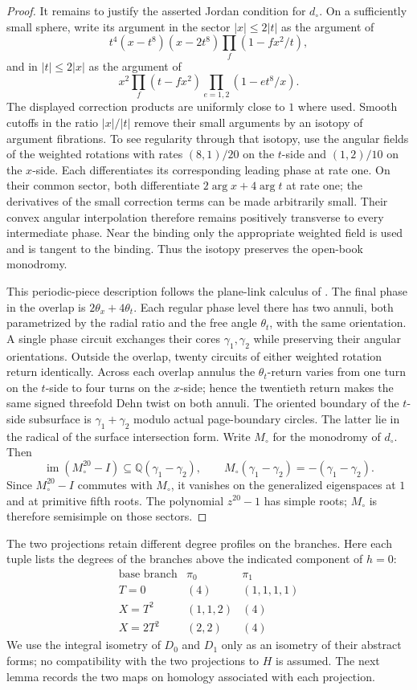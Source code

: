 \begin{proof}
It remains to justify the asserted Jordan condition for \(d_\circ\).
On a sufficiently small sphere, write its argument in the sector
\(|x|\le2|t|\) as the argument of
\[
 t^4(x-t^8)(x-2t^8)
 \prod_f(1-fx^2/t),
\]
and in \(|t|\le2|x|\) as the argument of
\[
 x^2\prod_f(t-fx^2)
 \prod_{e=1,2}(1-et^8/x).
\]
The displayed correction products are uniformly close to \(1\)
where used. Smooth cutoffs in the ratio \(|x|/|t|\) remove their
small arguments by an isotopy of argument fibrations. To see
regularity through that isotopy, use the angular fields of the
weighted rotations with rates \((8,1)/20\) on the \(t\)-side and
\((1,2)/10\) on the \(x\)-side. Each differentiates its corresponding
leading phase at rate one. On their common sector, both differentiate
\(2\arg x+4\arg t\) at rate one; the derivatives of the small
correction terms can be made arbitrarily small. Their convex angular
interpolation therefore remains positively transverse to every
intermediate phase. Near the binding only the appropriate weighted
field is used and is tangent to the binding. Thus the isotopy
preserves the open-book monodromy.

This periodic-piece description follows the plane-link calculus of \cite[Sections~11 and~13]{EisenbudNeumann1985}. The final phase in the overlap is \(2\theta_x+4\theta_t\).
Each regular phase level there has two annuli, both parametrized
by the radial ratio and the free angle \(\theta_t\), with the same
orientation. A single phase circuit exchanges their cores
\(\gamma_1,\gamma_2\) while preserving their angular orientations.
Outside the overlap, twenty circuits of either weighted rotation
return identically. Across each overlap annulus the
\(\theta_t\)-return varies from one turn on the \(t\)-side to four
turns on the \(x\)-side; hence the twentieth return makes the same
signed threefold Dehn twist on both annuli. The oriented boundary
of the \(t\)-side subsurface is \(\gamma_1+\gamma_2\) modulo actual
page-boundary circles. The latter lie in the radical of the surface
intersection form. Write \(M_\circ\) for the monodromy of
\(d_\circ\). Then
\[
 \operatorname{im}(M_\circ^{20}-I)\subseteq
 \mathbb Q(\gamma_1-\gamma_2),\qquad
 M_\circ(\gamma_1-\gamma_2)=-(\gamma_1-\gamma_2).
\]
Since \(M_\circ^{20}-I\) commutes with \(M_\circ\), it vanishes on the generalized
eigenspaces at \(1\) and at primitive fifth roots. The polynomial
\(z^{20}-1\) has simple roots; \(M_\circ\) is therefore semisimple on
those sectors.
\end{proof}

The two projections retain different degree profiles on the branches.
Here each tuple lists the degrees of the branches above the indicated
component of \(h=0\):
\[
\begin{array}{c|c|c}
\text{base branch} & \pi_0 & \pi_1\\ \hline
T=0     &(4)&(1,1,1,1)\\
X=T^2   &(1,1,2)&(4)\\
X=2T^2  &(2,2)&(4)
\end{array}
\]
We use the integral isometry of \(D_0\) and \(D_1\) only as an isometry
of their abstract forms; no compatibility with the two projections to
\(H\) is assumed.  The next lemma records the two maps on homology
associated with each projection.

